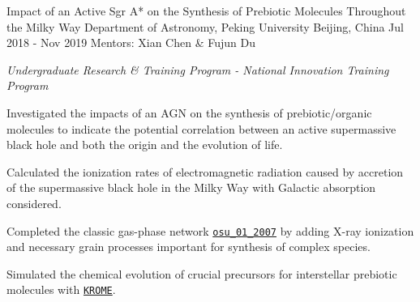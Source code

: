 


\begin{cvexperiences}


\cvexperience
{Impact of an Active Sgr A* on the Synthesis of Prebiotic Molecules Throughout the Milky Way} %
{Department of Astronomy, Peking University} %
{Beijing, China} %
{Jul 2018 - Nov 2019} %
{Mentors: Xian Chen \& Fujun Du}
{ %
\begin{cvitems}
\item {\textit{Undergraduate Research \& Training Program - National Innovation Training Program}}
\item {Investigated the impacts of an AGN on the synthesis of prebiotic/organic molecules to indicate the potential correlation between an active supermassive black hole and both the origin and the evolution of life.}
\item {Calculated the ionization rates of electromagnetic radiation caused by accretion of the supermassive black hole in the Milky Way with Galactic absorption considered.}
\item {Completed the classic gas-phase network \href{http://faculty.virginia.edu/ericherb/research_files/osu_01_2007}{\texttt{osu\_01\_2007}} by adding  X-ray ionization and necessary grain processes important for synthesis of complex species.}
\item {Simulated the chemical evolution of crucial precursors for interstellar prebiotic molecules with \href{http://kromepackage.org}{\texttt{KROME}}.}
\end{cvitems}
}


\end{cvexperiences}
